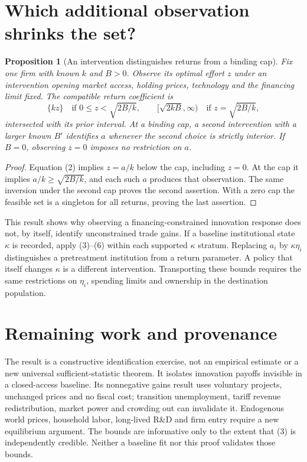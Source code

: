 \documentclass[11pt]{article}
\newtheorem{proposition}[theorem]{Proposition}
\begin{document}
\section{Which additional observation shrinks the set?}
\begin{proposition}[An intervention distinguishes returns from a binding cap]
Fix one firm with known $k$ and $B>0$. Observe its optimal effort $z$ under
an intervention opening market access, holding prices, technology and the
financing limit fixed. The compatible return coefficient is
\[
 \{kz\}\quad\text{if }0\leq z<\sqrt{2B/k},\qquad
 [\sqrt{2kB},\infty)\quad\text{if }z=\sqrt{2B/k},               \tag{6}
\]
intersected with its prior interval. At a binding cap, a second intervention
with a larger known $B'$ identifies $a$ whenever the second choice is
strictly interior. If $B=0$, observing $z=0$ imposes no restriction on $a$.
\end{proposition}
\begin{proof}
Equation (2) implies $z=a/k$ below the cap, including $z=0$.
At the cap it implies $a/k\geq\sqrt{2B/k}$, and each such $a$ produces
that observation. The same inversion under the second cap proves the
second assertion. With a zero cap the feasible set is a singleton for
all returns, proving the last assertion.
\end{proof}
This result shows why observing a financing-constrained innovation response
does not, by itself, identify unconstrained trade gains. If a baseline
institutional state $\kappa$ is recorded, apply (3)--(6) within each
supported $\kappa$ stratum. Replacing $a_i$ by $\kappa\eta_i$ distinguishes
a pretreatment institution from a return parameter. A policy that itself
changes $\kappa$ is a different intervention. Transporting these bounds
requires the same restrictions on $\eta_i$, spending limits and ownership
in the destination population.

\section{Remaining work and provenance}
The result is a constructive identification exercise, not an empirical
estimate or a new universal sufficient-statistic theorem. It isolates
innovation payoffs invisible in a closed-access baseline. Its nonnegative
gains result uses voluntary projects, unchanged prices and no fiscal cost;
transition unemployment, tariff revenue redistribution, market power and
crowding out can invalidate it. Endogenous world prices, household labor,
long-lived R\&D and firm entry require a new equilibrium argument. The
bounds are informative only to the extent that (3) is independently
credible. Neither a baseline fit nor this proof validates those bounds.
\end{document}
